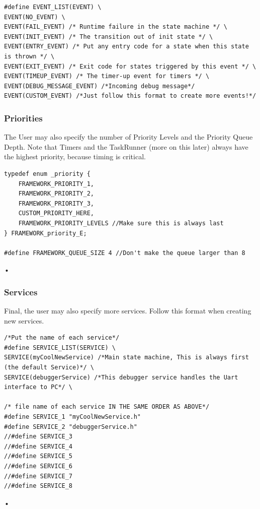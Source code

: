 \documentclass[12pt compsoc]{article}
\begin{document}
\begin{verbatim}
#define EVENT_LIST(EVENT) \
EVENT(NO_EVENT) \
EVENT(FAIL_EVENT) /* Runtime failure in the state machine */ \
EVENT(INIT_EVENT) /* The transition out of init state */ \
EVENT(ENTRY_EVENT) /* Put any entry code for a state when this state is thrown */ \
EVENT(EXIT_EVENT) /* Exit code for states triggered by this event */ \
EVENT(TIMEUP_EVENT) /* The timer-up event for timers */ \
EVENT(DEBUG_MESSAGE_EVENT) /*Incoming debug message*/ 
EVENT(CUSTOM_EVENT) /*Just follow this format to create more events!*/ 
\end{verbatim}

\subsubsection{Priorities}

The User may also specify the number of Priority Levels and the Priority Queue Depth. Note that Timers and the TaskRunner (more on this later) always have the highest priority, because timing is critical.

\begin{verbatim}
typedef enum _priority {
    FRAMEWORK_PRIORITY_1,
    FRAMEWORK_PRIORITY_2,
    FRAMEWORK_PRIORITY_3,
    CUSTOM_PRIORITY_HERE,
    FRAMEWORK_PRIORITY_LEVELS //Make sure this is always last
} FRAMEWORK_priority_E;

#define FRAMEWORK_QUEUE_SIZE 4 //Don't make the queue larger than 8
\end{verbatim}•

\subsubsection{Services}
Final, the user may also specify more services. Follow this format when creating new services.

\begin{verbatim}
/*Put the name of each service*/
#define SERVICE_LIST(SERVICE) \
SERVICE(myCoolNewService) /*Main state machine, This is always first (the default Service)*/ \
SERVICE(debuggerService) /*This debugger service handles the Uart interface to PC*/ \

/* file name of each service IN THE SAME ORDER AS ABOVE*/
#define SERVICE_1 "myCoolNewService.h"
#define SERVICE_2 "debuggerService.h"
//#define SERVICE_3
//#define SERVICE_4 
//#define SERVICE_5 
//#define SERVICE_6 
//#define SERVICE_7 
//#define SERVICE_8 
\end{verbatim}•
\end{document}
